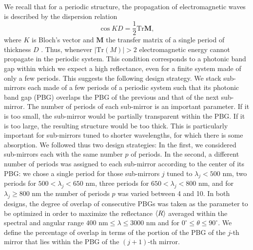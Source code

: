 \documentclass[a4paper,fleqn]{cas-sc}
\begin{document}
	We recall that for a periodic structure, the propagation of
	electromagnetic waves is described by the dispersion relation
	\begin{equation}
		\cos KD = \frac{1}{2} \text{Tr} \bm M,   \label{Dispersion}
	\end{equation}
	where $K$ is Bloch's vector and $\bm M$ the transfer matrix of a single
	period of thickness $D$ \cite{Mochan1987, Mochan1988,
		Perez2018}. Thus,
	whenever $\left\vert\text {Tr} \left(M \right) \right\vert>2$
	electromagnetic energy cannot propagate in the periodic system. This condition corresponds to a
	photonic band gap within which we
	expect a high reflectance, even for a finite system made of only a few periods. This suggests
	the following design strategy. We stack sub-mirrors
	each made of a few periods of a periodic system such that its photonic band gap
	(PBG) overlaps the PBG of the previous and that of the next
	sub-mirror. The number of periods of each sub-mirror is an
	important parameter. If it is too small, the sub-mirror would be
	partially transparent within the PBG. If it is too large, the
	resulting structure would be too thick. This is particularly important
	for sub-mirrors tuned to shorter wavelengths, for which there is some
	absorption. We followed thus two design
	strategies: In the first, we considered sub-mirrors each with the same
	number $p$ of periods. In the second, a different number of periods was
	assigned to each sub-mirror according to the center of its PBG: we chose
	a single period for those sub-mirrors $j$ tuned to
	$\lambda_{j}<500$ nm, two periods for $500 <\lambda_ {j} < 650$ nm,
	three periods for $650<\lambda_ {j}<800$ nm, and for
	$\lambda_{j} \geq 800$ nm the number of periods $p$ was varied between
	4 and 10. In both designs, the degree of overlap of consecutive PBGs was
	taken as the parameter to be optimized in order to maximize
	the reflectance $\braket{R}$ averaged within the spectral and
	angular range $400\text{ nm}\le
	\lambda\le 3000\text{ nm}$ and for $0^\circ\le\theta\le90^\circ$.
	We define the percentage of overlap in terms of the portion of the PBG of the
	$j$-th mirror that lies within the PBG of the $(j + 1)$-th
	mirror.
	
\end{document}

